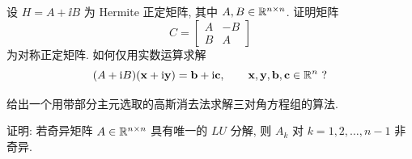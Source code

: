 \begin{exercises}
  \item 设 $H=A+\ii B$ 为 Hermite 正定矩阵, 其中 $A,B\in\mathbb{R}^{n\times n}$.
  \subquest 证明矩阵
  \[
    C=
    \begin{bmatrix}
      A & -B\\
      B & A
    \end{bmatrix}
  \]
  为对称正定矩阵.
  \subquest 如何仅用实数运算求解
  \[
    (A+\ii B)(\mathbf{x}+\ii\mathbf{y})=\mathbf{b}+\ii\mathbf{c},
    \qquad \mathbf{x},\mathbf{y},\mathbf{b},\mathbf{c}\in\R^n\ ?
  \]

  \item 给出一个用带部分主元选取的高斯消去法求解三对角方程组的算法.

  \item 证明: 若奇异矩阵 $A\in\mathbb{R}^{n\times n}$ 具有唯一的 $LU$ 分解, 则 $A_k$ 对 $k=1,2,\ldots,n-1$ 非奇异.
\end{exercises}
